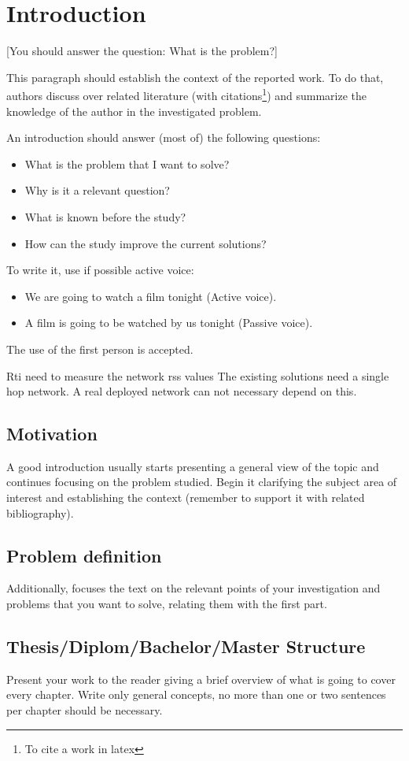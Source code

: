 \chapter{Introduction}

[You should answer the question: What is the problem?]

This paragraph should establish the context of the reported work. To do that, authors discuss over related literature (with citations\footnote{To cite a work in latex  }) and summarize the knowledge of the author in the investigated problem.

An introduction should answer (most of) the following questions:
\begin{itemize}
	\item What is the problem that I want to solve?
	\item Why is it a relevant question?
	\item What is known before the study?
	\item How can the study improve the current solutions?
\end{itemize}

To write it, use if possible active voice:
\begin{itemize}
	\item We are going to watch a film tonight (Active voice).
	\item A film is going to be watched by us tonight (Passive voice).
\end{itemize}
The use of the first person is accepted.

Rti need to measure the network rss values
The existing solutions need a single hop network.
A real deployed network can not necessary depend on this.

 


\section{Motivation}

A good introduction usually starts presenting a general view of the topic and continues focusing on the problem studied. Begin it clarifying the subject area of interest and establishing the context (remember to support it with related bibliography).



\section{Problem definition}
Additionally, focuses the text on the relevant points of your investigation and problems that you want to solve, relating them with the first part.




\section{Thesis/Diplom/Bachelor/Master Structure}
Present your work to the reader giving a brief overview of what is going to cover every chapter. Write only general concepts, no more than one or two sentences per chapter should be necessary. 
